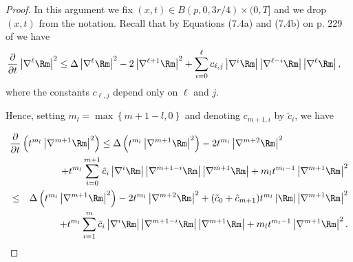 \begin{proof} In this argument we fix
$(x,t)\in B(p,0,3r/4)\times (0,T]$ and we drop $(x,t)$ from the
notation. Recall that by Equations (7.4a) and (7.4b) on p. 229 of
\cite{ChowKnopf}  we have
\begin{align}
\frac{\partial}{\partial t}\left\vert \nabla^{\ell
}\Rm\right\vert ^{2} & \leq\Delta\left\vert
\nabla^{\ell }\Rm\right\vert ^{2} -2\left\vert
\nabla^{\ell +1}\Rm\right\vert ^{2}+\sum_{i=0} ^{\ell
}c_{\ell,j}\left\vert \nabla^{i}\Rm\right\vert
\left\vert \nabla^{\ell -i}\Rm\right\vert \left\vert
\nabla^{\ell } \Rm\right\vert, \label{curderfor}
\end{align}
where the constants $c_{\ell,j}$ depend only on $\ell$ and $j$.


Hence, setting $m_l= \max\left\{ m+1-l,0\right\}$ and denoting
$c_{m+1,i}$ by $\tilde c_i$, we have

\begin{eqnarray}
\lefteqn{\frac{\partial}{\partial t}\left(  t^{m_l}\left\vert
\nabla^{m+1}\Rm\right\vert ^{2}\right)
 \leq\Delta\left(  t^{m_l }\left\vert \nabla
^{m+1}\Rm\right\vert ^{2}\right)  -2t^{m_l }
\left\vert \nabla^{m+2}\Rm\right\vert ^{2}}\label{1steqn}\\
& & +t^{m_l  }\sum_{i=0}^{m+1}\tilde c_{i}\left\vert \nabla
^{i}\Rm\right\vert \left\vert
\nabla^{m+1-i}\Rm \right\vert \left\vert
\nabla^{m+1}\Rm\right\vert
 +m_l  t^{m_l -1}\left\vert \nabla^{m+1}\Rm\right\vert ^{2}\nonumber\\
&  \leq & \Delta\left(  t^{m_l }\left\vert \nabla
^{m+1}\Rm\right\vert ^{2}\right)  -2t^{m_l }
\left\vert \nabla^{m+2}\Rm\right\vert ^{2} +(\tilde
c_{0}+\tilde
c_{m+1})t^{m_l}\left\vert\Rm\right\vert\left\vert\nabla^{m+1}\Rm
\right\vert^2\nonumber\\ & &+ t^{m_l }\sum_{i=1}^{m}\tilde
c_{i}\left\vert \nabla
^{i}\Rm\right\vert \left\vert \nabla^{m+1-i}\Rm%
\right\vert \left\vert \nabla^{m+1}\Rm\right\vert
+m_l  t^{m_l -1}\left\vert \nabla^{m+1}\Rm\right\vert
^{2}.\nonumber
\end{eqnarray}


\end{proof}
